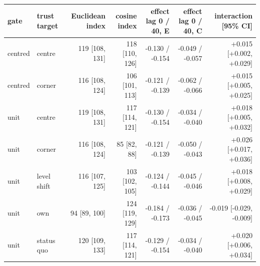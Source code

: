\begin{tabular}{llrrrrr}
\toprule
gate & trust target & Euclidean index & cosine index & effect lag 0 / 40, E & effect lag 0 / 40, C & interaction [95\% CI] \\
\midrule
centred & centre & 119 [108, 131] & 118 [110, 126] & -0.130 / -0.154 & -0.049 / -0.057 & +0.015 [+0.002, +0.029] \\
centred & corner & 116 [108, 124] & 106 [101, 113] & -0.121 / -0.139 & -0.062 / -0.066 & +0.015 [+0.005, +0.025] \\
unit & centre & 119 [108, 131] & 117 [114, 121] & -0.130 / -0.154 & -0.034 / -0.040 & +0.018 [+0.005, +0.032] \\
unit & corner & 116 [108, 124] & 85 [82, 88] & -0.121 / -0.139 & -0.050 / -0.043 & +0.026 [+0.017, +0.036] \\
unit & level shift & 116 [107, 125] & 103 [102, 105] & -0.124 / -0.144 & -0.045 / -0.046 & +0.018 [+0.008, +0.029] \\
unit & own & 94 [89, 100] & 124 [119, 129] & -0.184 / -0.173 & -0.036 / -0.045 & -0.019 [-0.029, -0.009] \\
unit & status quo & 120 [109, 133] & 117 [114, 121] & -0.129 / -0.154 & -0.034 / -0.040 & +0.020 [+0.006, +0.034] \\
\bottomrule
\end{tabular}
